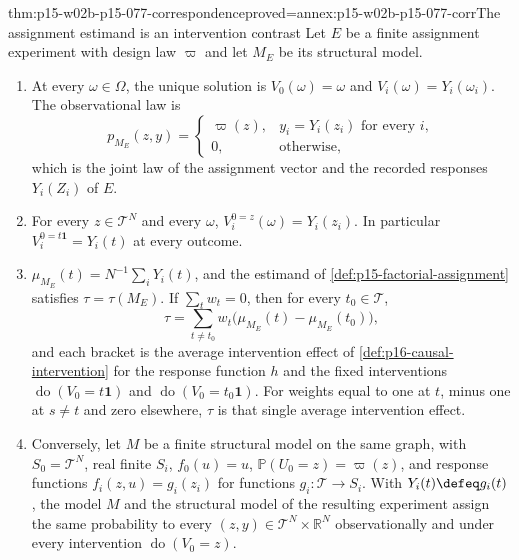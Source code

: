 \begin{hbtheorem}{thm:p15-w02b-p15-077-correspondence}{proved=annex:p15-w02b-p15-077-corr}{The assignment estimand is an intervention contrast}
Let \(E\) be a finite assignment experiment with design law \(\varpi\)
and let \(M_E\) be its structural model.
\begin{enumerate}
\item At every \(\omega\in\Omega\), the unique solution is
      \(V_0(\omega)=\omega\) and \(V_i(\omega)=Y_i(\omega_i)\). The
      observational law is
      \[
       p_{M_E}(z,y)=\begin{cases}\varpi(z),&y_i=Y_i(z_i)\text{ for every }i,\\
                    0,&\text{otherwise},\end{cases}
      \]
      which is the joint law of the assignment vector and the recorded
      responses \(Y_i(Z_i)\) of \(E\).
\item For every \(z\in\mathcal T^N\) and every \(\omega\),
      \(V_i^{0=z}(\omega)=Y_i(z_i)\). In particular
      \(V_i^{0=t\mathbf 1}=Y_i(t)\) at every outcome.
\item \(\mu_{M_E}(t)=N^{-1}\sum_iY_i(t)\), and the estimand of
      \cref{def:p15-factorial-assignment} satisfies
      \(\tau=\tau(M_E)\). If \(\sum_tw_t=0\), then for every
      \(t_0\in\mathcal T\),
      \[
       \tau=\sum_{t\ne t_0}w_t\bigl(\mu_{M_E}(t)-\mu_{M_E}(t_0)\bigr),
      \]
      and each bracket is the average intervention effect of
      \cref{def:p16-causal-intervention} for the response function \(h\)
      and the fixed interventions \(\operatorname{do}(V_0=t\mathbf 1)\)
      and \(\operatorname{do}(V_0=t_0\mathbf 1)\). For weights equal to
      one at \(t\), minus one at \(s\ne t\) and zero elsewhere,
      \(\tau\) is that single average intervention effect.
\item Conversely, let \(M\) be a finite structural model on the same graph,
      with \(S_0=\mathcal T^N\), real finite \(S_i\),
      \(f_0(u)=u\), \(\mathbb P(U_0=z)=\varpi(z)\), and response functions
      \(f_i(z,u)=g_i(z_i)\) for functions
      \(g_i:\mathcal T\to S_i\). With \(Y_i(t)\defeq g_i(t)\), the model
      \(M\) and the structural model of the resulting experiment assign the
      same probability to every \((z,y)\in\mathcal T^N\times\mathbb R^N\)
      observationally and under every intervention
      \(\operatorname{do}(V_0=z)\).
\end{enumerate}
\end{hbtheorem}

